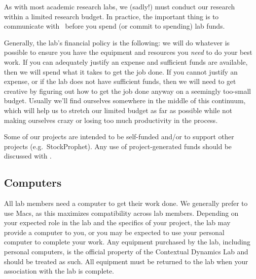 \documentclass{tufte-book} %
\begin{document}

\noindent  As with most academic research labs, we (sadly!) must conduct our
 research within a limited research budget.  In practice, the
 important thing is to communicate with \director~before you spend (or
 commit to spending) lab funds.

 Generally, the lab's financial policy is the following: we will do
 whatever is possible to ensure you have the equipment and resources
 you \textit{need} to do your best work.  If you can adequately
 justify an expense and sufficient funds are available, then we will
 spend what it takes to get the job done.  If you cannot justify an
 expense, or if the lab does not have sufficient funds, then we will
 need to get creative by figuring out how to get the job done anyway
 on a seemingly too-small budget.  Usually we'll find ourselves
 somewhere in the middle of this continuum, which will help us to
 stretch our limited budget as far as possible while not making
 ourselves crazy or losing too much productivity in the process.

 Some of our projects are intended to be self-funded and/or to support
 other projects (e.g.\ StockProphet).  Any use of project-generated
 funds should be discussed with \director.

 \subsection{Computers}
All lab members need a computer to get their work done.  We generally
prefer to use Macs, as this maximizes compatibility across lab
members.  Depending on your expected role in the lab and the specifics
of your project, the lab may provide a computer to you, or you may be
expected to use your personal computer to complete your work.  Any
equipment purchased by the lab, including personal computers, is the
official property of the Contextual Dynamics Lab and should be treated
as such.  All equipment must be returned to the lab when your
association with the lab is complete.
\end{document}
